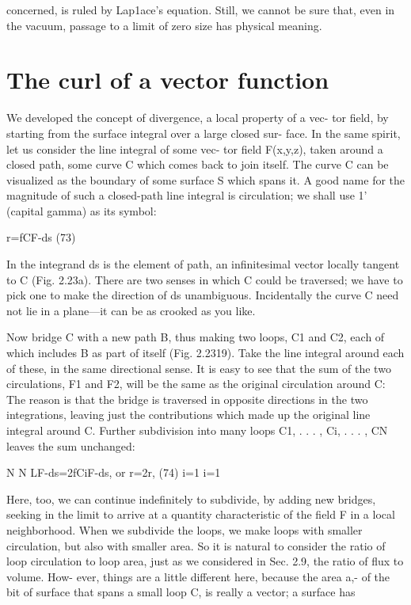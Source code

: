  

concerned, is ruled by Lap1ace's equation. Still, we cannot be sure
that, even in the vacuum, passage to a limit of zero size has physical
meaning.

\section{The curl of a vector function}

We developed the concept of divergence, a local property of a vec-
tor field, by starting from the surface integral over a large closed sur-
face. In the same spirit, let us consider the line integral of some vec-
tor field F(x,y,z), taken around a closed path, some curve C which
comes back to join itself. The curve C can be visualized as the
boundary of some surface S which spans it. A good name for the
magnitude of such a closed-path line integral is circulation; we shall
use 1' (capital gamma) as its symbol:

r=fCF-ds (73)

In the integrand ds is the element of path, an infinitesimal vector
locally tangent to C (Fig. 2.23a). There are two senses in which C
could be traversed; we have to pick one to make the direction of ds
unambiguous. Incidentally the curve C need not lie in a plane---it
can be as crooked as you like.

Now bridge C with a new path B, thus making two loops, C1 and
C2, each of which includes B as part of itself (Fig. 2.2319). Take the
line integral around each of these, in the same directional sense. It
is easy to see that the sum of the two circulations, F1 and F2, will be
the same as the original circulation around C: The reason is that the
bridge is traversed in opposite directions in the two integrations,
leaving just the contributions which made up the original line integral
around C. Further subdivision into many loops C1, . . . , Ci, . . . , CN
leaves the sum unchanged:

N N
LF-ds=2fCiF-ds, or r=2r, (74)
i=1 i=1

Here, too, we can continue indefinitely to subdivide, by adding
new bridges, seeking in the limit to arrive at a quantity characteristic
of the field F in a local neighborhood. When we subdivide the loops,
we make loops with smaller circulation, but also with smaller area.
So it is natural to consider the ratio of loop circulation to loop area,
just as we considered in Sec. 2.9, the ratio of flux to volume. How-
ever, things are a little different here, because the area a,- of the bit
of surface that spans a small loop C, is really a vector; a surface has

